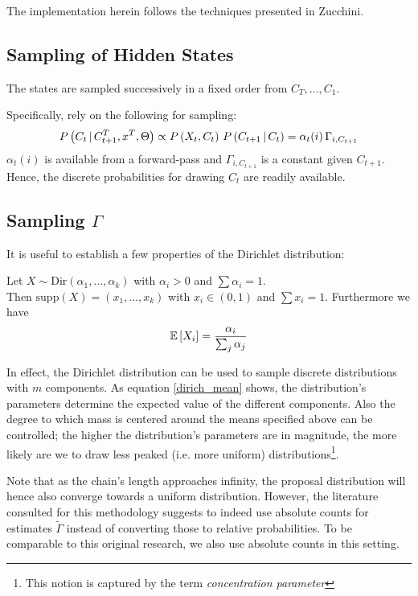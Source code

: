 The implementation herein follows the techniques presented in Zucchini\cite{zucchini}.

\subsection{Sampling of Hidden States}
	The states are sampled successively in a fixed order from $C_T, \dots, C_1$. 
	
	Specifically, rely on the following for sampling:
	\[
		P\left(C_t \, | \, C_{t+1}^T, x^{T}, \Theta\right) \propto 
		P \left(X_t, C_t\right) \, P\left(C_{t+1} \, | \, C_t\right) = \alpha_t(i) \, \Gamma_{i, C_{t+1}} 
	\]
	$\alpha_t(i)$ is available from a forward-pass and $\Gamma_{i, C_{t+1}}$ is a constant given $C_{t+1}$. Hence, the discrete probabilities for drawing $C_t$ are readily available. 
	
	
 \subsection{Sampling $\Gamma$}
 	It is useful to establish a few properties of the Dirichlet distribution:
	 \begin{lemma}
	 	Let $X \sim \text{Dir}(\alpha_1, \dots, \alpha_k)$ with $\alpha_i > 0$ and $\sum \alpha_i  = 1$.\\
	 	
	 	Then $\text{supp}(X) = (x_1, \dots, x_k)$ with $x_i \in (0, 1)$ and $\sum x_i = 1$. Furthermore we have
	 	\begin{align}
	 	\mathbb{E}\left[ X_i \right] = \frac{\alpha_i}{\sum_{j} \alpha_j}
	 	\label{dirich_mean}
	 	\end{align}
	 \end{lemma}
 	
 	In effect, the Dirichlet distribution can be used to sample discrete distributions with $m$ components. As equation \ref{dirich_mean} shows, the distribution's parameters determine the expected value of the different components. Also the degree to which mass is centered around the means specified above can be controlled; the higher the distribution's parameters are in magnitude, the more likely are we to draw less peaked (i.e. more uniform) distributions\footnote{This notion is captured by the term \textit{concentration parameter}}. 
 	
 	Note that as the chain's length approaches infinity, the proposal distribution will hence also converge towards a uniform distribution. However, the literature consulted for this methodology suggests to indeed use absolute counts for estimates $\tilde{\Gamma}$ instead of converting those to relative probabilities. To be comparable to this original research, we also use absolute counts in this setting. 
 
